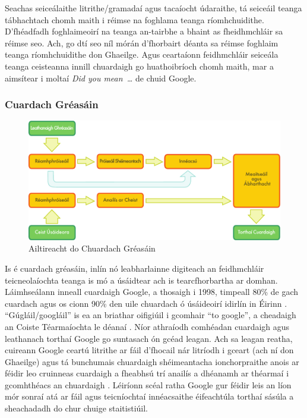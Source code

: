 \begin{multicols}{2}

Seachas seiceálaithe litrithe/gramadaí agus tacaíocht údaraithe, tá seiceáil teanga tábhachtach chomh maith i réimse na foghlama teanga ríomhchuidithe. D’fhéadfadh foghlaimeoirí na teanga an-tairbhe a bhaint as fheidhmchláir sa réimse seo. Ach, go dtí seo níl mórán d’fhorbairt déanta sa réimse foghlaim teanga ríomhchuidithe don Ghaeilge. Agus ceartaíonn feidhmchláir seiceála teanga ceisteanna innill chuardaigh go huathoibríoch chomh maith, mar a aimsítear i moltaí \textit{Did you mean~\dots} de chuid Google.

\subsubsection{Cuardach Gréasáin}

\begin{figure}[htb]
  \center
  \includegraphics[width=\textwidth]{../_media/irish/web_search_architecture}
  \caption{Ailtireacht do Chuardach Gréasáin}
  \label{fig:websearcharch_de}
\end{figure}

Is é cuardach gréasáin, inlín nó leabharlainne digiteach an feidhmchláir teicneolaíochta teanga is mó a úsáidtear ach is tearcfhorbartha ar domhan. Láimhseálann inneall cuardaigh Google, a thosaigh i 1998, timpeall 80\% de gach cuardach agus os cionn 90\% den uile chuardach ó úsáideoirí idirlín in Éirinn \cite{googlemarketshare}.  ``Gúgláil/googláil'' is ea an briathar oifigiúil i gcomhair ``to google'', a cheadaigh an Coiste Téarmaíochta le déanaí \cite{kilgarriff2010}.  Níor athraíodh comhéadan cuardaigh agus leathanach torthaí Google go suntasach ón gcéad leagan. Ach sa leagan reatha, cuireann Google ceartú litrithe ar fáil d’fhocail nár litríodh i gceart (ach ní don Ghaeilge) agus tá bunchumais chuardaigh shéimeantacha ionchorpraithe anois ar féidir leo cruinneas cuardaigh a fheabhsú trí anailís a dhéanamh ar théarmaí i gcomhthéacs an chuardaigh \cite{googlesemsearch}. Léiríonn scéal ratha Google gur féidir leis an líon mór sonraí atá ar fáil agus teicníochtaí innéacsaithe éifeachtúla torthaí sásúla a sheachadadh do chur chuige staitistiúil. 


\end{multicols}

